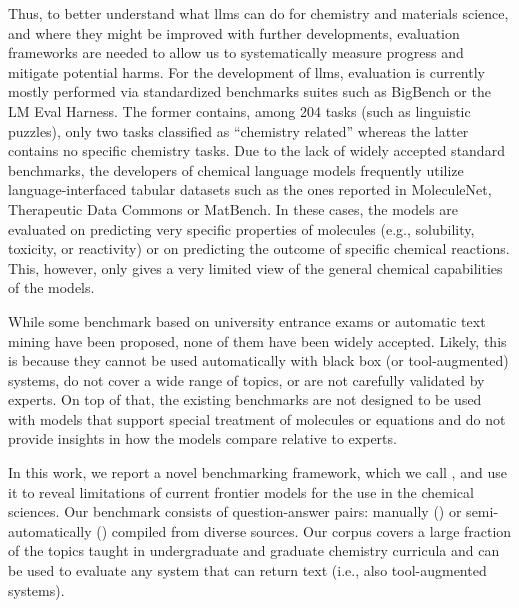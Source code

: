 \documentclass[11pt, oneside]{article}
\begin{document}
\begin{refsection}
Thus, to better understand what \glspl{llm} can do for chemistry and materials science, and where they might be improved with further developments, evaluation frameworks are needed to allow us to systematically measure progress and mitigate potential harms.
For the development of \glspl{llm}, evaluation is currently mostly performed via standardized benchmarks suites such as BigBench\autocite{srivastava2022beyond} or the LM Eval Harness.\autocite{eval-harness}
The former contains, among 204 tasks (such as linguistic puzzles), only two tasks classified as \enquote{chemistry related} whereas the latter contains no specific chemistry tasks.
Due to the lack of widely accepted standard benchmarks, the developers of chemical language models\autocite{jablonka2024leveraging, guo2023large, ahmad2022chemberta2, Cai_2024, frey2023neural} frequently utilize language-interfaced\autocite{dinh2022lift} tabular datasets such as the ones reported in MoleculeNet,\autocite{wu2018moleculenet} Therapeutic Data Commons\autocite{huang2021therapeutics} or MatBench.\autocite{dunn2020benchmarking}
In these cases, the models are evaluated on predicting very specific properties of molecules (e.g., solubility, toxicity, or reactivity) or on predicting the outcome of specific chemical reactions.
This, however, only gives a very limited view of the general chemical capabilities of the models.

While some benchmark based on university entrance exams\autocite{Zaki_2024, arora2023llms} or automatic text mining\autocite{song2023honeybee, wei2021chemistryqa} have been proposed, none of them have been widely accepted.
Likely, this is because they cannot be used automatically with black box (or tool-augmented) systems, do not cover a wide range of topics, or are not carefully validated by experts.
On top of that, the existing benchmarks are not designed to be used with models that support special treatment of molecules or equations and do not provide insights in how the models compare relative to experts.

In this work, we report a novel benchmarking framework, which we call \chembench, and use it to reveal limitations of current frontier models for the use in the chemical sciences.
Our benchmark consists of \xspace question-answer pairs: manually (\unskip) or semi-automatically (\unskip) compiled from diverse sources.
Our corpus covers a large fraction of the topics taught in undergraduate and graduate chemistry curricula and can be used to evaluate any system that can return text (i.e., also tool-augmented systems).


\end{refsection}
\end{document}
